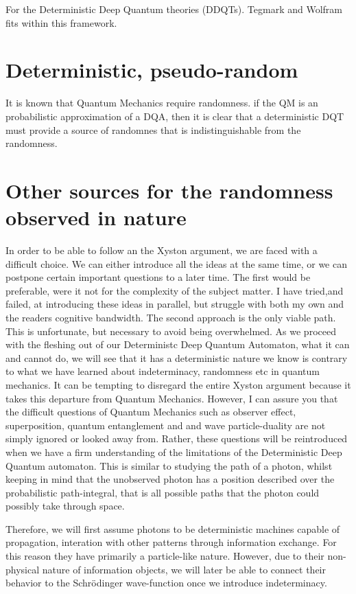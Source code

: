 \documentclass[notitlepage]{report}
\begin{document}
For the Deterministic Deep Quantum theories (DDQTs).  Tegmark and Wolfram fits within this framework.

\section*{Deterministic, pseudo-random }
It is known that Quantum Mechanics require randomness. if the QM is an probabilistic approximation of a DQA, then it is clear that a deterministic DQT must provide a source of randomnes that is indistinguishable from the randomness. 

\section*{Other sources for the randomness observed in nature }
In order to be able to follow an the Xyston argument, we are faced with a difficult choice. We can either introduce all the ideas at the same time, or we can postpone certain important questions to a later time. The first would be preferable, were it not for the complexity of the subject matter. I have tried,and failed, at introducing these ideas in parallel, but struggle with both my own and the readers cognitive bandwidth. The second approach is the only viable path. This is unfortunate, but necessary to avoid being overwhelmed. As we proceed with the fleshing out of our Deterministc Deep Quantum Automaton, what it can and cannot do, we will see that it has a deterministic nature  we know is contrary to what we have learned about indeterminacy, randomness etc in quantum mechanics. It can be tempting to disregard the entire Xyston argument because it takes this departure from Quantum Mechanics. However, I can assure you that the difficult questions of Quantum Mechanics such as observer effect, superposition, quantum entanglement and and wave particle-duality are not simply ignored or looked away from. Rather, these questions will be reintroduced when we have a firm understanding of the limitations of the Deterministic Deep Quantum automaton. This is similar to studying the path of a photon, whilst keeping in mind that the unobserved photon has a position described over the probabilistic path-integral, that is all possible paths that the photon could possibly take through space.

Therefore, we will first assume photons to be deterministic machines capable of propagation, interation with other patterns through information exchange. For this reason they have primarily a particle-like nature. However, due to their non-physical nature of information objects, we will later be able to connect their behavior to the Schrödinger wave-function once we introduce indeterminacy.
\end{document}
